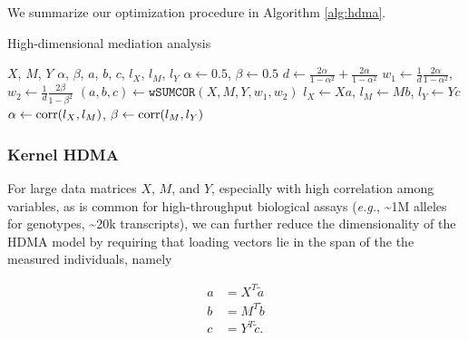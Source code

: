 \documentclass[
]{article}
\begin{document}
We summarize our optimization procedure in Algorithm \ref{alg:hdma}.

\begin{algorithm}
\caption{High-dimensional mediation analysis}\label{alg:hdma}
\begin{algorithmic}
\Require $X$, $M$, $Y$ 
\Ensure $\alpha$, $\beta$, $a$, $b$, $c$, $l_X$, $l_M$, $l_Y$ 
\State $\alpha \gets 0.5$, $\beta \gets 0.5$ 
\State $d \gets \frac{2\alpha}{1-\alpha^2} + \frac{2\alpha}{1-\alpha^2}$ 
\State $w_1 \gets \frac{1}{d}\frac{2\alpha}{1-\alpha^2}$, $w_2 \gets \frac{1}{d}\frac{2\beta}{1-\beta^2}$ 
\State $(a,b,c) \gets \texttt{wSUMCOR}(X, M, Y, w_1, w_2)$  
\State $l_X \gets Xa$, $l_M \gets Mb$, $l_Y \gets Yc$ 
\State $\alpha \gets {\rm corr}(l_X, l_M)$, $\beta \gets {\rm corr}(l_M, l_Y)$ 
\EndWhile
\end{algorithmic}
\end{algorithm}

\subsubsection{Kernel HDMA}\label{kernel-hdma}

For large data matrices \(X\), \(M\), and \(Y\), especially with high
correlation among variables, as is common for high-throughput biological
assays (\textit{e.g.}, \textasciitilde1M alleles for genotypes,
\textasciitilde20k transcripts), we can further reduce the
dimensionality of the HDMA model by requiring that loading vectors lie
in the span of the the measured individuals, namely

\begin{align}
a &= X^T \tilde{a} \\
b &= M^T \tilde{b} \\
c &= Y^T \tilde{c}.
\end{align}
\end{document}
